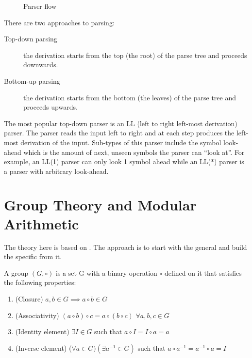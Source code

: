 \begin{figure}[hbt!]
  \centering
  \caption{Parser flow}
  \label{fig:parser_flow}
\end{figure}

There are two approaches to parsing:
\begin{description}
\item[Top-down parsing] the derivation starts from the top (the root)
  of the parse tree and proceeds downwards.
\item[Bottom-up parsing] the derivation starts from the bottom (the
  leaves) of the parse tree and proceeds upwards.
\end{description}

The most popular top-down parser is an LL (left to right left-most
derivation) parser. The parser reads the input left to right and at
each step produces the left-most derivation of the input. Sub-types of
this parser include the symbol look-ahead which is the amount of next,
unseen symbols the parser can ``look at''. For example, an LL(1)
parser can only look 1 symbol ahead while an LL(*) parser is a parser
with arbitrary look-ahead.

\section{Group Theory and Modular Arithmetic}

The theory here is based on \cite{HAC}. The approach is to start with
the general and build the specific from it.

\begin{defn}[Group]
  A group $(G, \circ)$ is a set G with a binary operation $\circ$ defined on it
  that satisfies the following properties:
  \begin{enumerate}
  \item (Closure) $a, b \in G \implies a \circ b \in G$ 
  \item (Associativity) $(a \circ b) \circ c = a \circ (b \circ c)$ $\forall a,b,c \in G$
  \item (Identity element) $\exists I \in G$ such that $a \circ I = I \circ a = a$
  \item (Inverse element) ($\forall a \in G)(\exists a^{-1} \in G)$ such that $a \circ
    a^{-1} = a^{-1} \circ a = I$
  \end{enumerate}
\end{defn}

